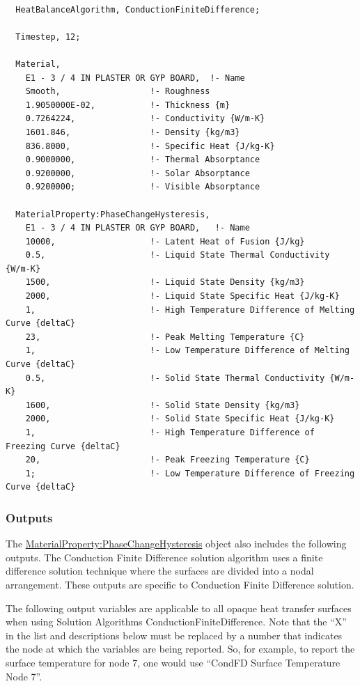 \begin{lstlisting}

  HeatBalanceAlgorithm, ConductionFiniteDifference;

  Timestep, 12;

  Material,
    E1 - 3 / 4 IN PLASTER OR GYP BOARD,  !- Name
    Smooth,                  !- Roughness
    1.9050000E-02,           !- Thickness {m}
    0.7264224,               !- Conductivity {W/m-K}
    1601.846,                !- Density {kg/m3}
    836.8000,                !- Specific Heat {J/kg-K}
    0.9000000,               !- Thermal Absorptance
    0.9200000,               !- Solar Absorptance
    0.9200000;               !- Visible Absorptance

  MaterialProperty:PhaseChangeHysteresis,
    E1 - 3 / 4 IN PLASTER OR GYP BOARD,   !- Name
    10000,                   !- Latent Heat of Fusion {J/kg}
    0.5,                     !- Liquid State Thermal Conductivity {W/m-K}
    1500,                    !- Liquid State Density {kg/m3}
    2000,                    !- Liquid State Specific Heat {J/kg-K}
    1,                       !- High Temperature Difference of Melting Curve {deltaC}
    23,                      !- Peak Melting Temperature {C}
    1,                       !- Low Temperature Difference of Melting Curve {deltaC}
    0.5,                     !- Solid State Thermal Conductivity {W/m-K}
    1600,                    !- Solid State Density {kg/m3}
    2000,                    !- Solid State Specific Heat {J/kg-K}
    1,                       !- High Temperature Difference of Freezing Curve {deltaC}
    20,                      !- Peak Freezing Temperature {C}
    1;                       !- Low Temperature Difference of Freezing Curve {deltaC}

\end{lstlisting}

\subsubsection{Outputs}\label{materialpropertyphasechangehysteresis-outputs}

The \hyperref[materialpropertyphasechangehysteresis]{MaterialProperty:PhaseChangeHysteresis} object also includes the following outputs.  The Conduction Finite Difference solution algorithm uses a finite difference solution technique where the surfaces are divided into a nodal arrangement. These outputs are specific to Conduction Finite Difference solution.

The following output variables are applicable to all opaque heat transfer surfaces when using Solution Algorithms ConductionFiniteDifference.  Note that the ``X'' in the list and descriptions below must be replaced by a number that indicates the node at which the variables are being reported.  So, for example, to report the surface temperature for node 7, one would use ``CondFD Surface Temperature Node 7''.

